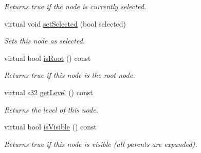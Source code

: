 \begin{DoxyCompactItemize}
\begin{DoxyCompactList}\small\item\em Returns true if the node is currently selected. \end{DoxyCompactList}\item 
\hypertarget{classirr_1_1gui_1_1_c_g_u_i_tree_view_node_ad0cd6de6eaf15a6b81ddf923c657cd05}{virtual void \hyperlink{classirr_1_1gui_1_1_c_g_u_i_tree_view_node_ad0cd6de6eaf15a6b81ddf923c657cd05}{set\-Selected} (bool selected)}\label{classirr_1_1gui_1_1_c_g_u_i_tree_view_node_ad0cd6de6eaf15a6b81ddf923c657cd05}

\begin{DoxyCompactList}\small\item\em Sets this node as selected. \end{DoxyCompactList}\item 
\hypertarget{classirr_1_1gui_1_1_c_g_u_i_tree_view_node_a73abfbd1ffaca017707338e479f04871}{virtual bool \hyperlink{classirr_1_1gui_1_1_c_g_u_i_tree_view_node_a73abfbd1ffaca017707338e479f04871}{is\-Root} () const }\label{classirr_1_1gui_1_1_c_g_u_i_tree_view_node_a73abfbd1ffaca017707338e479f04871}

\begin{DoxyCompactList}\small\item\em Returns true if this node is the root node. \end{DoxyCompactList}\item 
\hypertarget{classirr_1_1gui_1_1_c_g_u_i_tree_view_node_a7bd760bf663ed7a30773d524d12aff04}{virtual s32 \hyperlink{classirr_1_1gui_1_1_c_g_u_i_tree_view_node_a7bd760bf663ed7a30773d524d12aff04}{get\-Level} () const }\label{classirr_1_1gui_1_1_c_g_u_i_tree_view_node_a7bd760bf663ed7a30773d524d12aff04}

\begin{DoxyCompactList}\small\item\em Returns the level of this node. \end{DoxyCompactList}\item 
\hypertarget{classirr_1_1gui_1_1_c_g_u_i_tree_view_node_a114269a82e28502f8d405404c4ea79a9}{virtual bool \hyperlink{classirr_1_1gui_1_1_c_g_u_i_tree_view_node_a114269a82e28502f8d405404c4ea79a9}{is\-Visible} () const }\label{classirr_1_1gui_1_1_c_g_u_i_tree_view_node_a114269a82e28502f8d405404c4ea79a9}

\begin{DoxyCompactList}\small\item\em Returns true if this node is visible (all parents are expanded). \end{DoxyCompactList}\end{DoxyCompactItemize}

